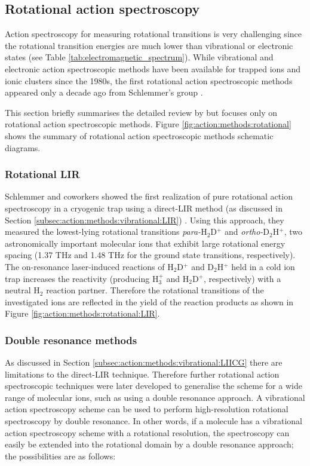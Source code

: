 \subsection{Rotational action spectroscopy}
\label{subsec:action:methods:rotational}

Action spectroscopy for measuring rotational transitions is very challenging
since the rotational transition energies are much lower than vibrational or
electronic states (see Table \ref{tab:electromagnetic_spectrum}). While
vibrational and electronic action spectroscopic methods have been available for
trapped ions and ionic clusters since the 1980s, the first rotational action
spectroscopic methods appeared only a decade ago from Schlemmer's group
\cite{Asvany2008}.

This section briefly summarises the detailed review by
\citet{Asvany2021} but focuses only on rotational action spectroscopic methods.
Figure \ref{fig:action:methods:rotational} shows the summary of rotational
action spectroscopic methods schematic diagrams.

\subsubsection{Rotational LIR}
\label{subsec:rotational-LIR}

Schlemmer and coworkers showed the first realization of pure rotational action
spectroscopy in a cryogenic trap using a direct-LIR method (as discussed in
Section \ref{subsec:action:methods:vibrational:LIR}) \cite{Asvany2008}. Using
this approach, they measured the lowest-lying rotational transitions
\emph{para-}H$_2$D$^+$ and \emph{ortho-}D$_2$H$^+$, two astronomically
important molecular ions that exhibit large rotational energy spacing (1.37 THz
and 1.48 THz for the ground state transitions, respectively). The on-resonance
laser-induced reactions of H$_2$D$^+$ and D$_2$H$^+$ held in a cold ion trap
increases the reactivity (producing H$_3^+$ and H$_2$D$^+$, respectively) with
a neutral H$_2$ reaction partner. Therefore the rotational transitions of the
investigated ions are reflected in the yield of the reaction products as shown
in Figure \ref{fig:action:methods:rotational:LIR}.

\subsubsection{Double resonance methods}
\label{subsec:action:methods:rotational:DR}

As discussed in Section \ref{subsec:action:methods:vibrational:LIICG} there are
limitations to the direct-LIR technique. Therefore further rotational action
spectroscopic techniques were later developed to generalise the scheme for a
wide range of molecular ions, such as using a double resonance approach. A
vibrational action spectroscopy scheme can be used to perform high-resolution
rotational spectroscopy by double resonance. In other words, if a molecule has
a vibrational action spectroscopy scheme with a rotational resolution, the
spectroscopy can easily be extended into the rotational domain by a double
resonance approach; the possibilities are as follows:

